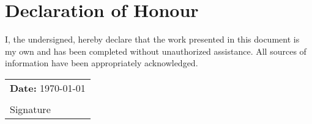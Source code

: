 \thispagestyle{empty}


\vfill

\section*{Declaration of Honour}
\vspace{1cm}

I, the undersigned, hereby declare that the work presented in this document is my own and has been completed without unauthorized assistance. All sources of information have been appropriately acknowledged.

\vspace{2cm}

\begin{flushright}
    \begin{tabular}{@{}p{}@{}}
        \textbf{Date:} \today \\[2cm] %
        \hrulefill \\
        Signature
    \end{tabular}
\end{flushright}

\vfill
\newpage

